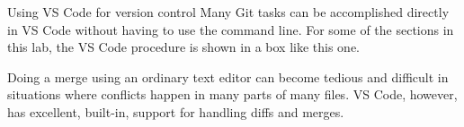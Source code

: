 \documentclass[11pt]{../sd3/ArcHandout}
\begin{document}
\begin{vscodebox}{Using VS Code for version control}
	Many Git tasks can be accomplished directly in VS Code without having to use the command line. For some of the sections in this lab, the VS Code procedure is shown in a box like this one.
\end{vscodebox}

\exercise
Doing a merge using an ordinary text editor can become tedious and difficult in situations where conflicts happen in many parts of many files. VS Code, however, has excellent, built-in, support for handling diffs and merges.\\


\cpyright
\end{document}
